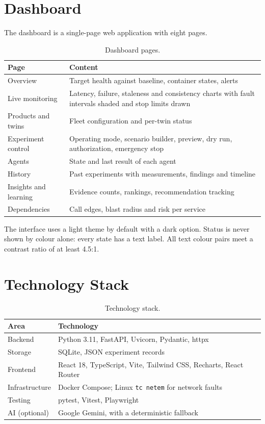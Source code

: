 \documentclass[11pt,a4paper]{article}
\begin{document}
\section{Dashboard}

The dashboard is a single-page web application with eight pages.

\begin{table}[h]
\centering
\begin{tabularx}{\textwidth}{@{}lL@{}}
\toprule
\textbf{Page} & \textbf{Content} \\
\midrule
Overview & Target health against baseline, container states, alerts \\
Live monitoring & Latency, failure, staleness and consistency charts with fault intervals shaded and stop limits drawn \\
Products and twins & Fleet configuration and per-twin status \\
Experiment control & Operating mode, scenario builder, preview, dry run, authorization, emergency stop \\
Agents & State and last result of each agent \\
History & Past experiments with measurements, findings and timeline \\
Insights and learning & Evidence counts, rankings, recommendation tracking \\
Dependencies & Call edges, blast radius and risk per service \\
\bottomrule
\end{tabularx}
\caption{Dashboard pages.}
\end{table}

The interface uses a light theme by default with a dark option. Status is
never shown by colour alone: every state has a text label. All text colour
pairs meet a contrast ratio of at least 4.5:1.

\section{Technology Stack}

\begin{table}[h]
\centering
\begin{tabularx}{\textwidth}{@{}lL@{}}
\toprule
\textbf{Area} & \textbf{Technology} \\
\midrule
Backend & Python 3.11, FastAPI, Uvicorn, Pydantic, httpx \\
Storage & SQLite, JSON experiment records \\
Frontend & React 18, TypeScript, Vite, Tailwind CSS, Recharts, React Router \\
Infrastructure & Docker Compose; Linux \texttt{tc netem} for network faults \\
Testing & pytest, Vitest, Playwright \\
AI (optional) & Google Gemini, with a deterministic fallback \\
\bottomrule
\end{tabularx}
\caption{Technology stack.}
\end{table}
\end{document}
